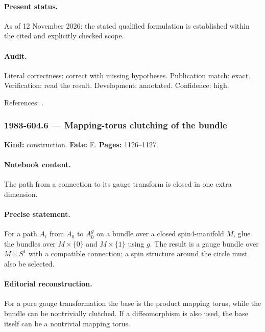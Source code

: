 \paragraph{Present status.} As of 12 November 2026: the stated qualified formulation is established within the cited and explicitly checked scope.

\paragraph{Audit.} Literal correctness: correct with missing hypotheses. Publication match: exact. Verification: read the result. Development: annotated. Confidence: high.

\noindent References: \citep{hatcher2002algebraic,wangwenwitten2019new}.\par

\subsubsection{1983-604.6 --- Mapping-torus clutching of the bundle}

\label{item:1983-604.6}

\noindent\textbf{Kind:} construction. \textbf{Fate:} E. \textbf{Pages:} 1126--1127.\par

\paragraph{Notebook content.} The path from a connection to its gauge transform is closed in one extra dimension.

\paragraph{Precise statement.} For a path \(A_t\) from \(A_0\) to \(A_0^g\) on a bundle over a closed spin4-manifold \(M\), glue the bundles over \(M\times\{0\}\) and \(M\times\{1\}\) using \(g\). The result is a gauge bundle over \(M\times S^1\) with a compatible connection; a spin structure around the circle must also be selected.

\paragraph{Editorial reconstruction.} For a pure gauge transformation the base is the product mapping torus, while the bundle can be nontrivially clutched. If a diffeomorphism is also used, the base itself can be a nontrivial mapping torus.

